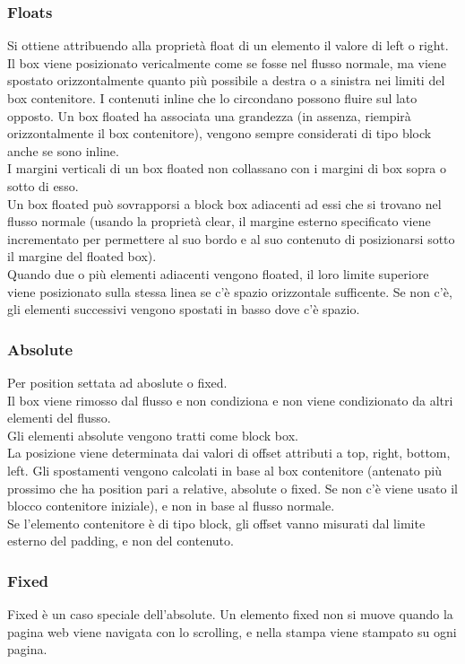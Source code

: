 \documentclass{article}
\begin{document}
\subsubsection{Floats}
Si ottiene attribuendo alla proprietà float di un elemento il valore di left o right.\\
Il box viene posizionato vericalmente come se fosse nel flusso normale, ma viene spostato orizzontalmente quanto più possibile a destra o a sinistra nei limiti del box contenitore. I contenuti inline che lo circondano possono fluire sul lato opposto. Un box floated ha associata una grandezza (in assenza, riempirà orizzontalmente il box contenitore), vengono sempre considerati di tipo block anche se sono inline.\\
I margini verticali di un box floated non collassano con i margini di box sopra o sotto di esso.\\
Un box floated può sovrapporsi a block box adiacenti ad essi che si trovano nel flusso normale (usando la proprietà clear, il margine esterno specificato viene incrementato per permettere al suo bordo e al suo contenuto di posizionarsi sotto il margine del floated box).\\
Quando due o più elementi adiacenti vengono floated, il loro limite superiore viene posizionato sulla stessa linea se c'è spazio orizzontale sufficente. Se non c'è, gli elementi successivi vengono spostati in basso dove c'è spazio.
\subsubsection{Absolute}
Per position settata ad aboslute o fixed.\\
Il box viene rimosso dal flusso e non condiziona e non viene condizionato da altri elementi del flusso.\\
Gli elementi absolute vengono tratti come block box.\\
La posizione viene determinata dai valori di offset attributi a top, right, bottom, left. Gli spostamenti vengono calcolati in base al box contenitore (antenato più prossimo che ha position pari a relative, absolute o fixed. Se non c'è viene usato il blocco contenitore iniziale), e non in base al flusso normale.\\
Se l'elemento contenitore è di tipo block, gli offset vanno misurati dal limite esterno del padding, e non del contenuto.
\subsubsection{Fixed}
Fixed è un caso speciale dell'absolute. Un elemento fixed non si muove quando la pagina web viene navigata con lo scrolling, e nella stampa viene stampato su ogni pagina.
\end{document}

